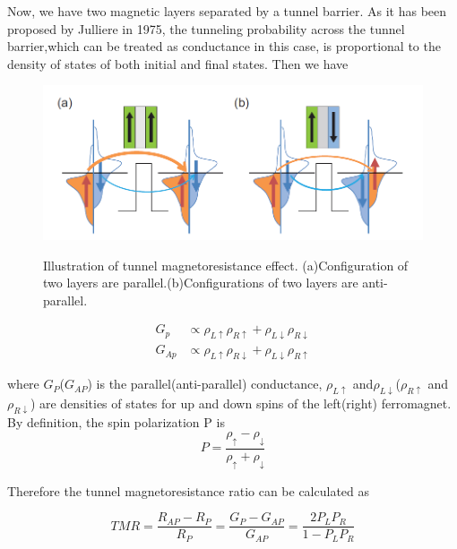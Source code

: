 Now, we have two magnetic layers separated by a tunnel barrier. As it has been proposed by Julliere in 1975, the tunneling probability across the tunnel barrier,which can be treated as conductance in this case, is proportional to the density of states of both initial and final states. Then we have 




\begin{figure}[!ht]
\centering
\includegraphics[width=1.0\textwidth]{fig/TMR.PNG}
\label{TMR}
\caption{Illustration of tunnel magnetoresistance effect. (a)Configuration of two layers are parallel.(b)Configurations of two layers are anti-parallel.}
\end{figure}


\begin{equation}
\label{eq:conductance}
\begin{aligned}
G_{p} &\propto  \rho_{L\uparrow}\rho_{R\uparrow}  + \rho_{L\downarrow}\rho_{R\downarrow}
\\
G_{Ap} &\propto  \rho_{L\uparrow}\rho_{R\downarrow}  + \rho_{L\downarrow}\rho_{R\uparrow}
\end{aligned}
\end{equation}


where $G_P$($G_{AP}$) is the parallel(anti-parallel) conductance, $\rho_{L\uparrow}$ and$\rho_{L\downarrow}$($\rho_{R\uparrow}$ and$\rho_{R\downarrow}$) are densities of states for up and down spins of the left(right) ferromagnet. By definition, the spin polarization P is 
\begin{equation}
P = \frac{\rho_{\uparrow} - \rho_{\downarrow}} {\rho_{\uparrow} + \rho_{\downarrow}}
\end{equation}

Therefore the tunnel magnetoresistance ratio can be calculated as

\begin{equation}
TMR = \frac{R_{AP} - R_{P}}{R_{P}}= \frac{G_{P} - G_{AP}}{G_{AP}} = \frac{2P_LP_R}{1-P_LP_R}
\end{equation}

